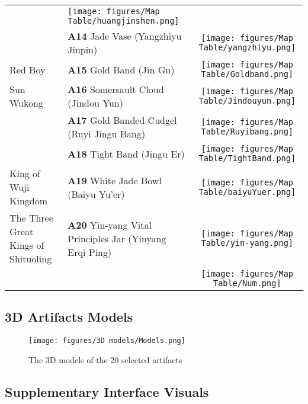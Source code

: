 \begin{table}[H]
{\begin{tabular}{llc}
 & \texttt{[image: figures/Map Table/huangjinshen.png]}\\
~  & \textbf{A14} Jade Vase (Yangzhiyu Jinpin)
 & \texttt{[image: figures/Map Table/yangzhiyu.png]}\\

Red Boy &\textbf{A15}  Gold Band (Jin Gu)
  & \texttt{[image: figures/Map Table/Goldband.png]}\\
Sun Wukong & \textbf{A16} Somersault Cloud (Jindou Yun)

 &\texttt{[image: figures/Map Table/Jindouyun.png]}\\

~ & \textbf{A17} Gold Banded Cudgel (Ruyi Jingu Bang)
& \texttt{[image: figures/Map Table/Ruyibang.png]}\\
~ & \textbf{A18} Tight Band (Jingu Er)
 & \texttt{[image: figures/Map Table/TightBand.png]}\\
King of Wuji Kingdom & \textbf{A19} White Jade Bowl (Baiyu Yu'er)

 & \texttt{[image: figures/Map Table/baiyuYuer.png]}\\

   \vspace{0.5em}
The Three Great Kings of Shituoling & \textbf{A20} Yin-yang Vital Principles Jar (Yinyang Erqi Ping)
 & \texttt{[image: figures/Map Table/yin-yang.png]}\\
~ & ~
 & \texttt{[image: figures/Map Table/Num.png]}\\
\end{tabular}
}
\end{table}
\vspace{-1em}
\subsection{3D Artifacts Models}
\vspace{-1em}
\begin{figure*}[h]
    \centering
    \texttt{[image: figures/3D models/Models.png]}
    \caption{The 3D models of the 20 selected artifacts}
    \label{fig:enter-label}
\end{figure*}

\newpage
\subsection{Supplementary Interface Visuals}

